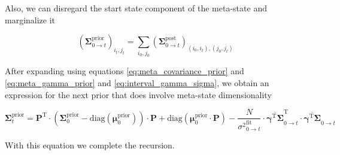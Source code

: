 \documentclass[pdflatex,sn-mathphys-num]{sn-jnl}%
\theoremstyle{thmstyleone}%
\theoremstyle{thmstyletwo}%
\theoremstyle{thmstylethree}%
\begin{document}
Also, we can disregard the start state component of the meta-state and marginalize it 


\begin{equation}
	(\boldsymbol{\Sigma}^{\mathrm{prior}}_{0 \rightarrow t})_{i_{t}, j_{t}} = \sum_{i_{0}, j_{0}} (\boldsymbol{\Sigma}^{\mathrm{post}}_{0 \rightarrow t})_{(i_{0}, i_{t}), (j_{0}, j_{t})}
	\label{eq:prior_covariance_marginalization}
\end{equation}

After expanding using equations \ref{eq:meta_covariance_prior} and \ref{eq:meta_gamma_prior} and \ref{eq:interval_gamma_sigma}, we obtain an expression for the next prior that does involve meta-state dimensionality


\begin{equation}
	\boldsymbol{\Sigma}^{\mathrm{prior}}_{t} = 
	\boldsymbol{P}^{\mathrm{T}} \cdot \left( \boldsymbol{\Sigma}^{\mathrm{prior}}_{0} - \mathrm{diag}(\boldsymbol{\mu}^{\mathrm{prior}}_{0}) \right) \cdot \boldsymbol{P}
	+ \mathrm{diag}(\boldsymbol{\mu}^{\mathrm{prior}}_{0} \cdot \boldsymbol{P}) 
	- \frac{N}{{\sigma^2}^{\mathrm{fit}}_{0 \rightarrow t}} \cdot
	\overline{\boldsymbol{\gamma}^{\mathrm{T}} \boldsymbol{\Sigma}}_{0 \rightarrow t}^{\mathrm{T}} \cdot \overline{\boldsymbol{\gamma}^{\mathrm{T}} \boldsymbol{\Sigma}}_{0 \rightarrow t}
	\label{eq:prior_covariance_update_0_t}
\end{equation}


With this equation we complete the recursion. 
\end{document}
